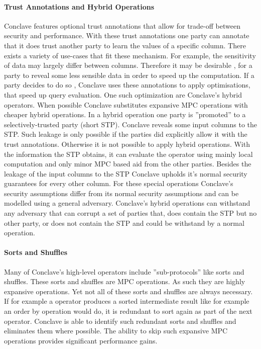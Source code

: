\label{Trust_label}	
\paragraph{Trust Annotations and Hybrid Operations}
Conclave features optional trust annotations that allow for trade-off between security and performance. With these trust annotations one party can annotate that it does trust another party to learn the values of a specific column. There exists a variety of use-cases that fit these mechanism. For example, the sensitivity of data may largely differ between columns. Therefore it may be desirable , for a party to reveal some less sensible data in order to speed up the computation. If a party decides to do so , Conclave uses these annotations to apply optimisations, that speed up query evaluation. One such optimization are Conclave's hybrid operators. When possible Conclave substitutes expansive MPC operations with cheaper hybrid operations. In a hybrid operation one party is ''promoted'' to a selectively-trusted party (short STP). Conclave reveals some input columns to the STP. Such leakage is only possible if the parties did explicitly allow it with the trust annotations. Otherwise it is not possible to apply hybrid operations. With the information the STP obtains, it can evaluate the operator using mainly local computation and only minor MPC based aid from the other parties. Besides the leakage of the input columns to the STP Conclave upholds it's normal security guarantees for every other column. For these special operations Conclave's security assumptions differ from its normal security assumptions and can be modelled using a general adversary. Conclave's hybrid operations can withstand any adversary that can corrupt a set of parties that, does contain the STP but no other party, or does not contain the STP and could be withstand by a normal operation. 
\paragraph{Sorts and Shuffles}
Many of Conclave's high-level operators include ''sub-protocols'' like sorts and shuffles. These sorts and shuffles are MPC operations. As such they are highly expansive operations. Yet not all of these sorts and shuffles are always necessary. If for example a operator produces a sorted intermediate result like for example an order by operation would do, it is redundant to sort again as part of the next operator. Conclave is able to identify such redundant sorts and shuffles and eliminates them where possible. The ability to skip such expansive MPC operations provides significant performance gains.

